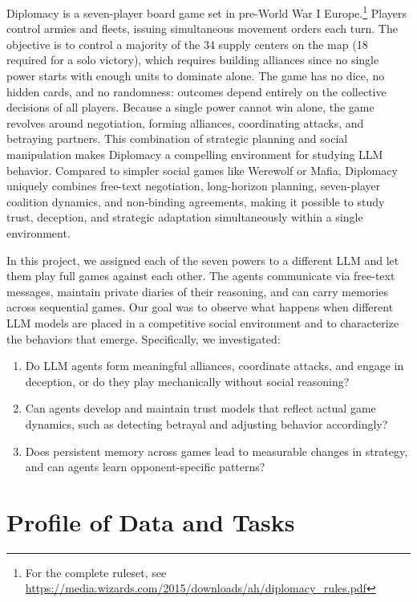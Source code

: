 \documentclass[a4paper,oneside,bibliography=totoc]{scrartcl}
\begin{document}
Diplomacy is a seven-player board game set in pre-World War I Europe.\footnote{For the complete ruleset, see \url{https://media.wizards.com/2015/downloads/ah/diplomacy_rules.pdf}} Players control armies and fleets, issuing simultaneous movement orders each turn. The objective is to control a majority of the 34 supply centers on the map (18 required for a solo victory), which requires building alliances since no single power starts with enough units to dominate alone. The game has no dice, no hidden cards, and no randomness: outcomes depend entirely on the collective decisions of all players. Because a single power cannot win alone, the game revolves around negotiation, forming alliances, coordinating attacks, and betraying partners. This combination of strategic planning and social manipulation makes Diplomacy a compelling environment for studying LLM behavior. Compared to simpler social games like Werewolf or Mafia, Diplomacy uniquely combines free-text negotiation, long-horizon planning, seven-player coalition dynamics, and non-binding agreements, making it possible to study trust, deception, and strategic adaptation simultaneously within a single environment.

In this project, we assigned each of the seven powers to a different LLM and let them play full games against each other. The agents communicate via free-text messages, maintain private diaries of their reasoning, and can carry memories across sequential games. Our goal was to observe what happens when different LLM models are placed in a competitive social environment and to characterize the behaviors that emerge. Specifically, we investigated:

\begin{enumerate}
  \item Do LLM agents form meaningful alliances, coordinate attacks, and engage in deception, or do they play mechanically without social reasoning?
  \item Can agents develop and maintain trust models that reflect actual game dynamics, such as detecting betrayal and adjusting behavior accordingly?
  \item Does persistent memory across games lead to measurable changes in strategy, and can agents learn opponent-specific patterns?
\end{enumerate}

\section{Profile of Data and Tasks}
\end{document}
